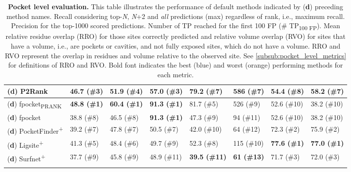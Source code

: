 \begin{landscape}
\begin{longtable}[c]{|M{29mm}|M{29mm}|M{31mm}|M{27mm}|M{30mm}|M{19mm}|M{18mm}|M{18mm}|}
\footnotesize{(\textbf{d})} P2Rank         & 46.7 (\#3)            & 51.9 (\#4)             & 57.0 (\#3)           & 79.2 (\#7)           & 586 (\#7)         & 54.4 (\#8)     & 58.2 (\#7)   \\ \hline
\footnotesize{(\textbf{d})} fpocket\textsubscript{PRANK}        & \textbf{\textcolor{CBBlue}{48.8 (\#1)}}           & \textbf{\textcolor{CBBlue}{60.4 (\#1)}}             & \textbf{\textcolor{CBBlue}{91.3 (\#1)}}         & 81.7 (\#5)           & 526 (\#9)          & 52.6 (\#10)     & 38.2 (\#10)     \\ \hline
\footnotesize{(\textbf{d})} fpocket        & 38.8 (\#8)           & 46.5 (\#8)             & \textbf{\textcolor{CBBlue}{91.3 (\#1)}}         & 47.3 (\#9)           & 94 (\#11)          & 52.6 (\#10)     & 38.2 (\#10)     \\ \hline
\footnotesize{(\textbf{d})} PocketFinder\textsuperscript{+}  & 39.2 (\#7)           & 47.8 (\#7)             & 50.5 (\#7)         & 42.0 (\#10)             & 64 (\#12)          & 72.3 (\#2)     & 75.9 (\#2)     \\ \hline
\footnotesize{(\textbf{d})} Ligsite\textsuperscript{+}       & 41.3 (\#5)           & 48.4 (\#6)             & 49.7 (\#9)         & 52.3 (\#8)           & 115 (\#10)         & \textbf{\textcolor{CBBlue}{77.6 (\#1)}}             & \textbf{\textcolor{CBBlue}{77.0 (\#1)}}             \\ \hline
\footnotesize{(\textbf{d})} Surfnet\textsuperscript{+}       & 37.7 (\#9)           & 45.8 (\#9)             & 48.9 (\#11)         & \textbf{\textcolor{CBOrange}{39.5 (\#11)}}           & \textbf{\textcolor{CBOrange}{61 (\#13)}}                  & 71.7 (\#3)     & 72.0 (\#3)     \\ \hline
\caption[Pocket level evaluation]{\textbf{Pocket level evaluation.} This table illustrates the performance of default methods indicated by (\textbf{d}) preceding method names. Recall considering top-\textit{N}, \textit{N}+2 and \textit{all} predictions (max) regardless of rank, i.e., maximum recall. Precision for the top-1000 scored predictions. Number of TP reached for the first 100 FP (\# TP\textsubscript{100 FP}). Mean relative residue overlap (RRO) for those sites correctly predicted and relative volume overlap (RVO) for sites that have a volume, i.e., are pockets or cavities, and not fully exposed sites, which do not have a volume. RRO and RVO represent the overlap in residues and volume relative to the observed site. See \autoref{subsub:pocket_level_metrics} for definitions of RRO and RVO. Bold font indicates the best (blue) and worst (orange) performing methods for each metric.}
\label{tab:pocket_level_benchmark}\\
\end{longtable}
\end{landscape}
\endgroup

